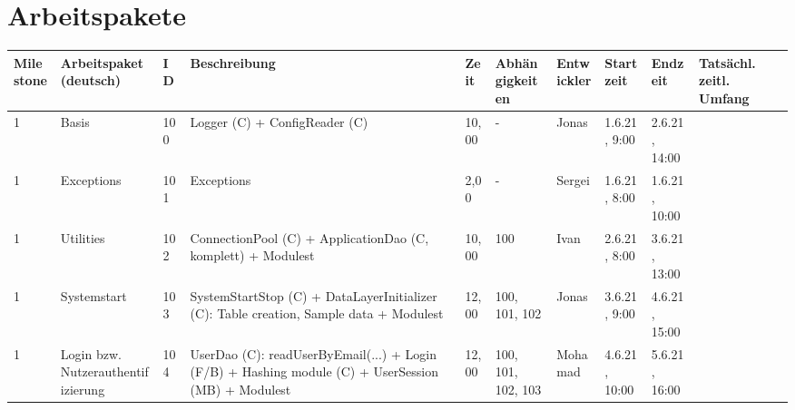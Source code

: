 \documentclass{article}
\begin{document}
\section{Arbeitspakete}
\begin{table}[H]
\centering
\begin{tabular}{l l  l  l l  l  l l  l l  l}
Milestone  & Arbeitspaket (deutsch)              & ID  & Beschreibung                                                                                                                                                                                                   & Zeit  & Abhängigkeiten     & Entwickler & Startzeit      & Endzeit        & Tatsächl. zeitl. Umfang \\ \hline
1          & Basis                               & 100 & Logger (C) + ConfigReader (C)                                                                                                                                                                                     & 10,00 & -                  & Jonas      & 1.6.21, 9:00   & 2.6.21, 14:00  &                         \\ \hline
1         & Exceptions                          & 101 & Exceptions                                                                                                                                                                                                     & 2,00  & -                  & Sergei     & 1.6.21, 8:00   & 1.6.21, 10:00  &                         \\ \hline
1          & Utilities                           & 102 & ConnectionPool (C) + ApplicationDao (C, komplett) + Modulest                                                                                                                                                         & 10,00 & 100                & Ivan       & 2.6.21, 8:00   & 3.6.21, 13:00  &                         \\ \hline
1          & Systemstart                         & 103 & SystemStartStop (C) + DataLayerInitializer (C): Table creation, Sample data + Modulest                                                                                                                               & 12,00 & 100, 101, 102      & Jonas      & 3.6.21, 9:00   & 4.6.21, 15:00  &                         \\ \hline
1          & Login bzw. Nutzerauthentifizierung  & 104 & UserDao (C): readUserByEmail(...) + Login (F/B) + Hashing module (C) + UserSession (MB) + Modulest                                                                                                                         & 12,00 & 100, 101, 102, 103 & Mohamad    & 4.6.21, 10:00  & 5.6.21, 16:00  &                         \\ \hline

\end{tabular}
\end{table}
\end{document}

